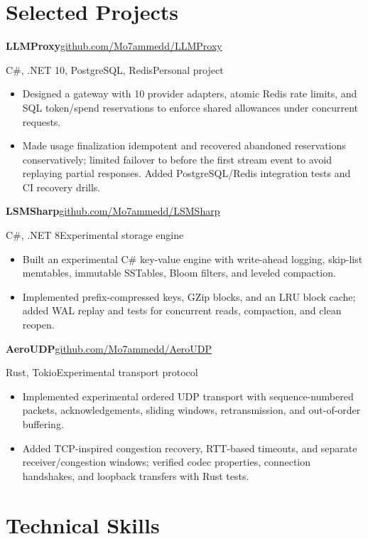 \documentclass[letterpaper,11pt]{article}
\newcommand{\project}[4]{%
  \par\addvspace{8pt}%
  \Needspace{5\baselineskip}%
  \textbf{#1}\hfill{\small\href{#3}{#4}}\par
  {\small#2}\par
}
\begin{document}
\newpage
\section{Selected Projects}

\project{LLMProxy}{C\#, .NET 10, PostgreSQL, Redis\enspace\textbar\enspace Personal project}
  {https://github.com/Mo7ammedd/LLMProxy}{github.com/Mo7ammedd/LLMProxy}
\begin{itemize}
  \item Designed a gateway with 10 provider adapters, atomic Redis rate limits, and SQL token/spend reservations to enforce shared allowances under concurrent requests.
  \item Made usage finalization idempotent and recovered abandoned reservations conservatively; limited failover to before the first stream event to avoid replaying partial responses. Added PostgreSQL/Redis integration tests and CI recovery drills.
\end{itemize}

\project{LSMSharp}{C\#, .NET 8\enspace\textbar\enspace Experimental storage engine}
  {https://github.com/Mo7ammedd/LSMSharp}{github.com/Mo7ammedd/LSMSharp}
\begin{itemize}
  \item Built an experimental C\# key-value engine with write-ahead logging, skip-list memtables, immutable SSTables, Bloom filters, and leveled compaction.
  \item Implemented prefix-compressed keys, GZip blocks, and an LRU block cache; added WAL replay and tests for concurrent reads, compaction, and clean reopen.
\end{itemize}

\project{AeroUDP}{Rust, Tokio\enspace\textbar\enspace Experimental transport protocol}
  {https://github.com/Mo7ammedd/AeroUDP}{github.com/Mo7ammedd/AeroUDP}
\begin{itemize}
  \item Implemented experimental ordered UDP transport with sequence-numbered packets, acknowledgements, sliding windows, retransmission, and out-of-order buffering.
  \item Added TCP-inspired congestion recovery, RTT-based timeouts, and separate receiver/congestion windows; verified codec properties, connection handshakes, and loopback transfers with Rust tests.
\end{itemize}

\section{Technical Skills}
\end{document}
